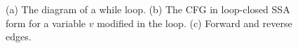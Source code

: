\documentclass[12pt]{gatech-thesis}
\begin{document}



\begin{figure}%
\caption{(a) The diagram of a while loop. (b) The CFG in loop-closed SSA form for a variable $v$ modified in the loop. (c) Forward and reverse edges.}
\label{fig:loop_example}
\end{figure}
\end{document}
